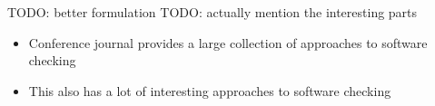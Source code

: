 TODO: better formulation
TODO: actually mention the interesting parts
\begin{itemize}
	\item Conference journal \citep{10.1007/978-3-030-17502-3_9} provides a large collection of approaches to software checking 
	\item This \citep{10.1007/978-3-030-45237-7_21} also has a lot of interesting approaches to software checking 
\end{itemize}